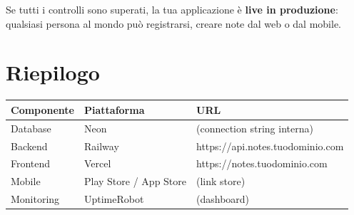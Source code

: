 \begin{checkpointbox}
Se tutti i controlli sono superati, la tua applicazione è \textbf{live in produzione}: qualsiasi persona al mondo può registrarsi, creare note dal web o dal mobile.
\end{checkpointbox}

\section*{Riepilogo}

\begin{center}
\begin{tabularx}{\textwidth}{l l X}
\toprule
\textbf{Componente} & \textbf{Piattaforma} & \textbf{URL} \\
\midrule
Database & Neon & (connection string interna) \\
Backend & Railway & https://api.notes.tuodominio.com \\
Frontend & Vercel & https://notes.tuodominio.com \\
Mobile & Play Store / App Store & (link store) \\
Monitoring & UptimeRobot & (dashboard) \\
\bottomrule
\end{tabularx}
\end{center}
